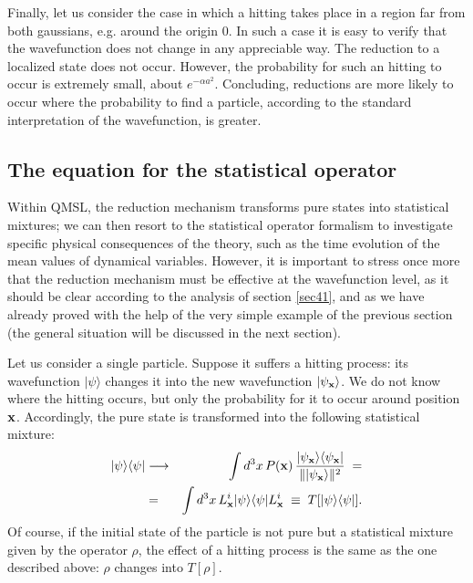 \documentclass[12pt]{article}
\begin{document}
Finally, let us consider the case in which a hitting takes place
in a region far from both gaussians, e.g. around the origin $0$.
In such a case it is easy to verify that the wavefunction does not
change in any appreciable way. The reduction to a localized state
does not occur. However, the probability for such an hitting to
occur is extremely small, about $e^{-\alpha a^{2}}$. Concluding,
reductions are more likely to occur where the probability to find
a particle, according to the standard interpretation of the
wavefunction, is greater.


\subsection{The equation for the statistical operator}
\label{sec52}

Within QMSL, the reduction mechanism transforms pure states into
statistical mixtures; we can then resort to the statistical
operator formalism to investigate specific physical consequences
of the theory, such as the time evolution of the mean values of
dynamical variables. However, it is important to stress once more that the
reduction mechanism must be effective at the wavefunction level,
as it should be clear according to the analysis of section
\ref{sec41}, and as we have already proved with the help of the
very simple example of the previous section (the general situation
will be discussed in the next section).

Let us consider a single particle. Suppose it suffers a hitting
process: its wavefunction $|\psi\rangle$ changes it into the new
wavefunction $|\psi_{\bf x}\rangle$. We do not know where the
hitting occurs, but only the probability for it to occur around
position ${\bf x}$. Accordingly, the pure state is transformed
into the following statistical mixture:
\begin{eqnarray}
|\psi\rangle\langle\psi| & \longrightarrow & \int d^{3} x\, P({\bf
x})\, \frac{|\psi_{\bf x}\rangle\langle\psi_{\bf x}|}{\|
|\psi_{\bf x}\rangle \|^{2}} \; = \nonumber \\ & = & \int d^{3}
x\, L^{i}_{\bf x} |\psi\rangle\langle\psi| L^{i}_{\bf x} \; \equiv
\; T[|\psi\rangle\langle\psi|].
\end{eqnarray}
Of course, if the initial state of the particle is not pure but a
statistical mixture given by the operator $\rho$, the effect of a
hitting process is the same as the one described above: $\rho$
changes into $T[\rho]$.
\end{document}
